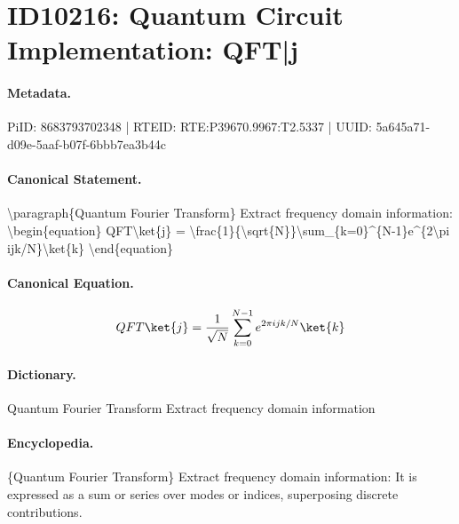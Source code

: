 \section*{ID10216: Quantum Circuit Implementation: QFT|j}
\paragraph{Metadata.}
PiID: 8683793702348 | RTEID: RTE:P39670.9967:T2.5337 | UUID: 5a645a71-d09e-5aaf-b07f-6bbb7ea3b44c

\paragraph{Canonical Statement.}
\textbackslash{}paragraph\{Quantum Fourier Transform\} Extract frequency domain information: \textbackslash{}begin\{equation\} QFT\textbackslash{}ket\{j\} = \textbackslash{}frac\{1\}\{\textbackslash{}sqrt\{N\}\}\textbackslash{}sum\_\{k=0\}\textasciicircum{}\{N-1\}e\textasciicircum{}\{2\textbackslash{}pi ijk/N\}\textbackslash{}ket\{k\} \textbackslash{}end\{equation\}

\paragraph{Canonical Equation.}
\[
QFT\ket{j} = \frac{1}{\sqrt{N}}\sum_{k=0}^{N-1}e^{2\pi ijk/N}\ket{k}
\]

\paragraph{Dictionary.}
Quantum Fourier Transform Extract frequency domain information

\paragraph{Encyclopedia.}
\{Quantum Fourier Transform\} Extract frequency domain information: It is expressed as a sum or series over modes or indices, superposing discrete contributions.
